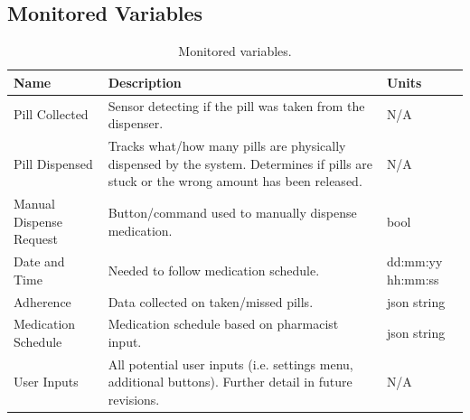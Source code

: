 \documentclass[12pt,titlepage]{article}
\begin{document}
\subsection{Monitored Variables}
\begin{table}[ht!]
\begin{center}
\begin{adjustbox}{max width=\textwidth}
\small
\begin{tabular}{|p{}|p{}|p{}|}
 \hline
 \textbf{Name} & \textbf{Description} & \textbf{Units}\\
 \hline 
Pill Collected & Sensor detecting if the pill was taken from the dispenser. & N/A\\
 \hline
 Pill Dispensed & Tracks what/how many pills are physically dispensed by the system. Determines if pills are stuck or the wrong amount has been released.  & N/A\\
 \hline
 Manual Dispense Request & Button/command used to manually dispense medication. & bool \\
 \hline
Date and Time & Needed to follow medication schedule. & dd:mm:yy hh:mm:ss\\
 \hline
Adherence & Data collected on taken/missed pills. & json string\\
 \hline
 Medication Schedule & Medication schedule based on pharmacist input. & json string\\
 \hline
User Inputs & All potential user inputs (i.e. settings menu, additional buttons). Further detail  in future revisions. & N/A\\
 \hline

\end{tabular}
\end{adjustbox}
\end{center}
\caption{Monitored variables.}
\end{table}
\end{document}
